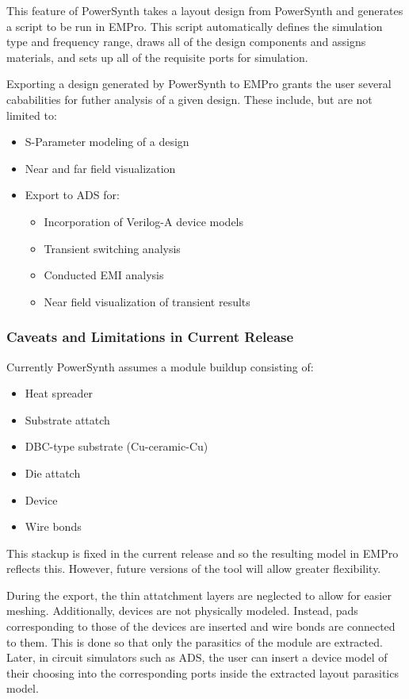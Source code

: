 \documentclass[11pt]{article}
\begin{document}
This feature of PowerSynth takes a layout design from PowerSynth and generates a script to be run in EMPro. This script automatically defines the simulation type and frequency range, draws all of the design components and assigns materials, and sets up all of the requisite ports for simulation.

Exporting a design generated by PowerSynth to EMPro grants the user several cababilities for futher analysis of a given design. These include, but are not limited to:
\begin{itemize}
\item S-Parameter modeling of a design
\item Near and far field visualization
\item Export to ADS for:
\begin{itemize}
\item Incorporation of Verilog-A device models
\item Transient switching analysis
\item Conducted EMI analysis
\item Near field visualization of transient results
\end{itemize}
\end{itemize}

\subsubsection{Caveats and Limitations in Current Release}
\label{sec-5-1-2}

Currently PowerSynth assumes a module buildup consisting of:
\begin{itemize}
\item Heat spreader
\item Substrate attatch
\item DBC-type substrate (Cu-ceramic-Cu)
\item Die attatch
\item Device
\item Wire bonds
\end{itemize}

This stackup is fixed in the current release and so the resulting model in EMPro reflects this. However, future versions of the tool will allow greater flexibility.

During the export, the thin attatchment layers are neglected to allow for easier meshing. Additionally, devices are not physically modeled. Instead, pads corresponding to those of the devices are inserted and wire bonds are connected to them. This is done so that only the parasitics of the module are extracted. Later, in circuit simulators such as ADS, the user can insert a device model of their choosing  into the corresponding ports inside the extracted layout parasitics model.
\end{document}
